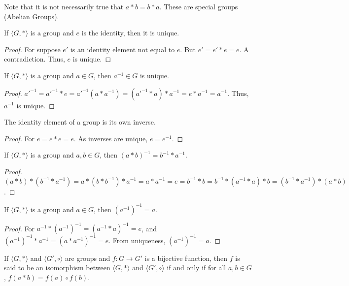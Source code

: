\documentclass[crop=false,class=article,oneside]{standalone}
\begin{document}
        \begin{remark}
        Note that it is not necessarily true that $a*b = b*a$. These are special groups (Abelian Groups).
        \end{remark}
        \begin{theorem}
        If $\langle G, * \rangle$ is a group and $e$ is the identity, then it is unique.
        \end{theorem}
        \begin{proof}
        For suppose $e'$ is an identity element not equal to $e$. But $e' = e'*e  = e$. A contradiction. Thus, $e$ is unique.
        \end{proof}
        \begin{theorem}
        If $\langle G, * \rangle$ is a group and $a\in G$, then $a^{-1}\in G$ is unique.
        \end{theorem}
        \begin{proof}
        $a'^{-1} = a'^{-1}*e = a'^{-1}(a*a^{-1}) = (a'^{-1}*a)*a^{-1} = e*a^{-1} = a^{-1}$. Thus, $a^{-1}$ is unique.
        \end{proof}
        \begin{corollary}
        The identity element of a group is its own inverse.
        \end{corollary}
        \begin{proof}
        For $e=e*e = e$. As inverses are unique, $e=e^{-1}$.
        \end{proof}
        \begin{theorem}
        If $\langle G,*\rangle$ is a group and $a,b\in G$, then $(a*b)^{-1} = b^{-1}*a^{-1}$.
        \end{theorem}
        \begin{proof}
        $(a*b)*(b^{-1}*a^{-1}) = a*(b*b^{-1})*a^{-1} = a*a^{-1} = e=b^{-1}*b=b^{-1}*(a^{-1}*a)*b=(b^{-1}*a^{-1})*(a*b)  $.
        \end{proof}
        \begin{theorem}
        If $\langle G,* \rangle$ is a group and $a\in G$, then $(a^{-1})^{-1} = a$.
        \end{theorem}
        \begin{proof}
        For $a^{-1}*(a^{-1})^{-1} = (a^{-1}* a)^{-1} = e$, and $(a^{-1})^{-1}*a^{-1} = (a*a^{-1})^{-1} = e$. From uniqueness, $(a^{-1})^{-1} = a$.
        \end{proof}
        \begin{definition}
        If $\langle G, * \rangle$ and $\langle G',\circ \rangle$ are groups and $f:G\rightarrow G'$ is a bijective function, then $f$ is said to be an isomorphism between $\langle G, * \rangle$ and $\langle G',\circ \rangle$ if and only if for all $a,b\in G$, $f(a*b) =f(a)\circ f(b)$.
        \end{definition}
\end{document}
